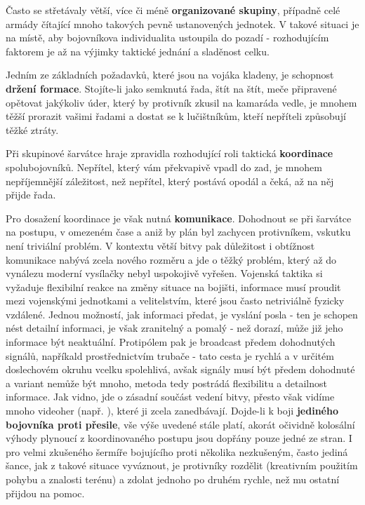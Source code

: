 Často se střetávaly větší, více či méně \textbf{organizované skupiny}, případně celé armády čítající mnoho takových pevně ustanovených jednotek. V takové situaci je na místě, aby bojovníkova individualita ustoupila do pozadí - rozhodujícím faktorem je až na výjimky taktické jednání a sladěnost celku. 

Jedním ze základních požadavků, které jsou na vojáka kladeny, je schopnost \textbf{držení formace}. Stojíte-li jako semknutá řada, štít na štít, meče připravené opětovat jakýkoliv úder, který by protivník zkusil na kamaráda vedle, je mnohem těžší prorazit vašimi řadami a dostat se k lučištníkům, kteří nepříteli způsobují těžké ztráty. 

Při skupinové šarvátce hraje zpravidla rozhodující roli taktická \textbf{koordinace} spolubojovníků. Nepřítel, který vám překvapivě vpadl do zad, je mnohem nepříjemnější záležitost, než nepřítel, který postává opodál a čeká, až na něj přijde řada.  

Pro dosažení koordinace je však nutná \textbf{komunikace}. Dohodnout se při šarvátce na postupu, v omezeném čase a aniž by plán byl zachycen protivníkem, vskutku není triviální problém. V kontextu větší bitvy pak důležitost i obtížnost komunikace nabývá zcela nového rozměru a jde o těžký problém, který až do vynálezu moderní vysílačky nebyl uspokojivě vyřešen. Vojenská taktika si vyžaduje flexibilní reakce na změny situace na bojišti, informace musí proudit mezi vojenskými jednotkami a velitelstvím, které jsou často netriviálně fyzicky vzdálené. Jednou možností, jak informaci předat, je vyslání posla - ten je schopen nést detailní informaci, je však zranitelný a pomalý - než dorazí, může již jeho informace být neaktuální. Protipólem pak je broadcast předem dohodnutých signálů, napříkald prostřednictvím trubače - tato cesta je rychlá a v určitém doslechovém okruhu vcelku spolehlivá, avšak signály musí být předem dohodnuté a variant nemůže být mnoho, metoda tedy postrádá flexibilitu a detailnost informace. Jak vidno, jde o zásadní součást vedení bitvy, přesto však vidíme mnoho videoher (např. \cite{Medieval2TotalWar} \cite{Warcraft3}), které ji zcela zanedbávají.
\bigbreak
Dojde-li k boji \textbf{jediného bojovníka proti přesile}, vše výše uvedené stále platí, akorát očividně kolosální výhody plynoucí z koordinovaného postupu jsou dopřány pouze jedné ze stran. I pro velmi zkušeného šermíře bojujícího proti několika nezkušeným, často jediná šance, jak z takové situace vyváznout, je protivníky rozdělit (kreativním použitím pohybu a znalosti terénu) a zdolat jednoho po druhém rychle, než mu ostatní přijdou na pomoc.

